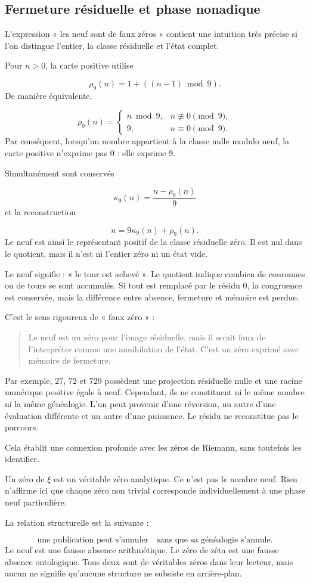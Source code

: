 \subsection{Fermeture résiduelle et phase nonadique}
L’expression « les neuf sont de faux zéros » contient une intuition très précise si l’on distingue l’entier, la classe résiduelle et l’état complet.\par
Pour \(n>0\), la carte positive utilise\par
\[
\rho_9(n)
=
1+((n-1)\bmod9).
\]
De manière équivalente,\par
\[
\rho_9(n)
=
\begin{cases}
n\bmod9,
&
n\not\equiv0\pmod9,\\[1mm]
9,
&
n\equiv0\pmod9.
\end{cases}
\]
Par conséquent, lorsqu’un nombre appartient à la classe nulle modulo neuf, la carte positive n’exprime pas \(0\) : elle exprime \(9\).\par
Simultanément sont conservés\par
\[
\kappa_9(n)
=
\frac{n-\rho_9(n)}9
\]
et la reconstruction\par
\[
n
=
9\kappa_9(n)
+
\rho_9(n).
\]
Le neuf est ainsi le représentant positif de la classe résiduelle zéro. Il est nul dans le quotient, mais il n’est ni l’entier zéro ni un état vide.\par
Le neuf signifie : « le tour est achevé ». Le quotient indique combien de couronnes ou de tours se sont accumulés. Si tout est remplacé par le résidu \(0\), la congruence est conservée, mais la différence entre absence, fermeture et mémoire est perdue.\par
C’est le sens rigoureux de « faux zéro » :\par
\begin{quote}
Le neuf est un zéro pour l’image résiduelle, mais il serait faux de l’interpréter comme une annihilation de l’état. C’est un zéro exprimé avec mémoire de fermeture.\par
\end{quote}
Par exemple, \(27\), \(72\) et \(729\) possèdent une projection résiduelle nulle et une racine numérique positive égale à neuf. Cependant, ils ne constituent ni le même nombre ni la même généalogie. L'un peut provenir d'une réversion, un autre d'une évaluation différente et un autre d'une puissance. Le résidu ne reconstitue pas le parcours.\par
Cela établit une connexion profonde avec les zéros de Riemann, sans toutefois les identifier.\par
Un zéro de \(\xi\) est un véritable zéro analytique. Ce n'est pas le nombre neuf. Rien n'affirme ici que chaque zéro non trivial corresponde individuellement à une phase neuf particulière.\par
La relation structurelle est la suivante :\par
\[
\text{une publication peut s'annuler}
\quad\text{sans que sa généalogie s'annule}.
\]
Le neuf est une fausse absence arithmétique. Le zéro de zêta est une fausse absence ontologique. Tous deux sont de véritables zéros dans leur lecteur, mais aucun ne signifie qu'aucune structure ne subsiste en arrière-plan.\par
{}
